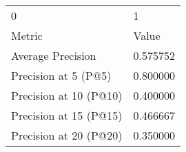 \begin{tabular}{ll}
0 & 1 \\
Metric & Value \\
Average Precision & 0.575752 \\
Precision at 5 (P@5) & 0.800000 \\
Precision at 10 (P@10) & 0.400000 \\
Precision at 15 (P@15) & 0.466667 \\
Precision at 20 (P@20) & 0.350000 \\
\end{tabular}
